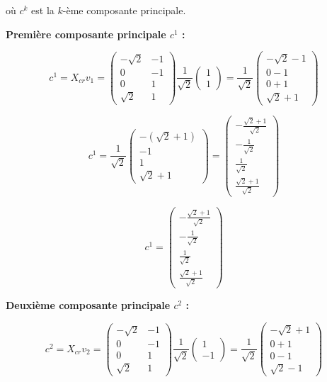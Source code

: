 \documentclass[11pt,a4paper]{article}
\begin{document}
où $c^k$ est la $k$-ème composante principale.

\textbf{Première composante principale $c^1$ :}

$$c^1 = X_{cr} v_1 = \begin{pmatrix}
-\sqrt{2} & -1 \\
0 & -1 \\
0 & 1 \\
\sqrt{2} & 1
\end{pmatrix} \frac{1}{\sqrt{2}} \begin{pmatrix} 1 \\ 1 \end{pmatrix} = \frac{1}{\sqrt{2}} \begin{pmatrix}
-\sqrt{2} - 1 \\
0 - 1 \\
0 + 1 \\
\sqrt{2} + 1
\end{pmatrix}$$

$$c^1 = \frac{1}{\sqrt{2}} \begin{pmatrix}
-(\sqrt{2} + 1) \\
-1 \\
1 \\
\sqrt{2} + 1
\end{pmatrix} = \begin{pmatrix}
-\frac{\sqrt{2} + 1}{\sqrt{2}} \\
-\frac{1}{\sqrt{2}} \\
\frac{1}{\sqrt{2}} \\
\frac{\sqrt{2} + 1}{\sqrt{2}}
\end{pmatrix}$$

$$\boxed{c^1 = \begin{pmatrix}
-\frac{\sqrt{2} + 1}{\sqrt{2}} \\
-\frac{1}{\sqrt{2}} \\
\frac{1}{\sqrt{2}} \\
\frac{\sqrt{2} + 1}{\sqrt{2}}
\end{pmatrix}}$$

\textbf{Deuxième composante principale $c^2$ :}

$$c^2 = X_{cr} v_2 = \begin{pmatrix}
-\sqrt{2} & -1 \\
0 & -1 \\
0 & 1 \\
\sqrt{2} & 1
\end{pmatrix} \frac{1}{\sqrt{2}} \begin{pmatrix} 1 \\ -1 \end{pmatrix} = \frac{1}{\sqrt{2}} \begin{pmatrix}
-\sqrt{2} + 1 \\
0 + 1 \\
0 - 1 \\
\sqrt{2} - 1
\end{pmatrix}$$
\end{document}
